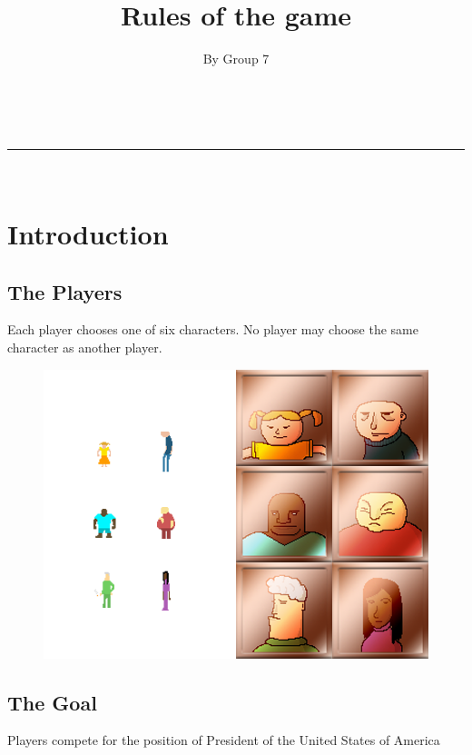 \documentclass[a4paper,11pt]{amsart}
\makeatletter
\newcommand{\linia}{\rule{\linewidth}{0.5pt}}
\renewcommand{\maketitle}{
\begin{center}
{\huge{\@title}}
\vspace{1ex}
\\
\linia\\
\vspace{2ex}
\end{center}
}
\makeatother
\begin{document}
\author{By Group 7}

\title{Rules of the game}
    \vspace*{.6cm}

  {\let\newpage\relax\maketitle}
 



\section{Introduction}
\subsection{The Players}
Each player chooses one of six characters. No player may choose the same character as another player.
\begin{figure}[h]
\includegraphics{characters}
\end{figure}

\subsection{The Goal}
Players compete for the position of President of the United States of America
\end{document}
